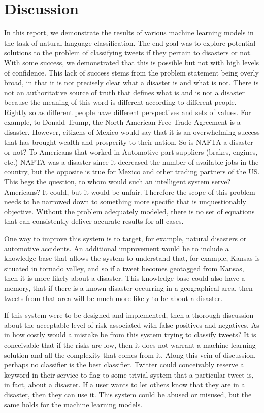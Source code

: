 \section{Discussion}
In this report, we demonstrate the results of various machine learning models in the task of natural language classification.
The end goal was to explore potential solutions to the problem of classifying tweets if they pertain to disasters or not.
With some success, we demonstrated that this is possible but not with high levels of confidence.
This lack of success stems from the problem statement being overly broad, in that it is not precisely clear what a disaster is and what is not.
There is not an authoritative source of truth that defines what is and is not a disaster because the meaning of this word is different according to different people.
Rightly so as different people have different perspectives and sets of values.
For example, to Donald Trump, the North American Free Trade Agreement is a disaster.
However, citizens of Mexico would say that it is an overwhelming success that has brought wealth and prosperity to their nation.
So is NAFTA a disaster or not? To Americans that worked in Automotive part suppliers (brakes, engines, etc.) NAFTA was a disaster since it decreased the number of available jobs in the country, but the opposite is true for Mexico and other trading partners of the US.
This begs the question, to whom would such an intelligent system serve? Americans? It could, but it would be unfair.
Therefore the scope of this problem needs to be narrowed down to something more specific that is unquestionably objective.
Without the problem adequately modeled, there is no set of equations that can consistently deliver accurate results for all cases.


One way to improve this system is to target, for example, natural disasters or automotive accidents.
An additional improvement would be to include a knowledge base that allows the system to understand that, for example, Kansas is situated in tornado valley, and so if a tweet becomes geotagged from Kansas, then it is more likely about a disaster.
This knowledge-base could also have a memory, that if there is a known disaster occurring in a geographical area, then tweets from that area will be much more likely to be about a disaster.


If this system were to be designed and implemented, then a thorough discussion about the acceptable level of risk associated with false positives and negatives.
As in how costly would a mistake be from this system trying to classify tweets? It is conceivable that if the risks are low, then it does not warrant a machine learning solution and all the complexity that comes from it.
Along this vein of discussion, perhaps no classifier is the best classifier.
Twitter could conceivably reserve a keyword in their service to flag to some trivial system that a particular tweet is, in fact, about a disaster.
If a user wants to let others know that they are in a disaster, then they can use it.
This system could be abused or misused, but the same holds for the machine learning models.


